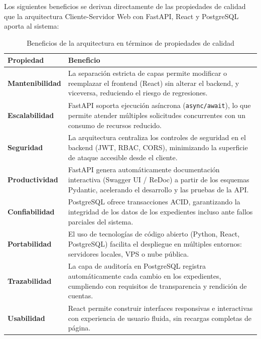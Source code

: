 Los siguientes beneficios se derivan directamente de las propiedades de calidad que la
arquitectura Cliente-Servidor Web con FastAPI, React y PostgreSQL aporta al sistema:

\begin{table}[h!]
	\centering
	\caption{Beneficios de la arquitectura en términos de propiedades de calidad}
	\renewcommand{\arraystretch}{1.4}
	\begin{tabular}{|p{3.2cm}|p{9.8cm}|}
		\hline
		\textbf{Propiedad}          & \textbf{Beneficio}                                                                                 \\ \hline
		\textbf{Mantenibilidad}     & La separación estricta de capas permite modificar o reemplazar el frontend (React)
		sin alterar el backend, y viceversa, reduciendo el riesgo de regresiones.             \\ \hline
		\textbf{Escalabilidad}      & FastAPI soporta ejecución asíncrona (\texttt{async/await}), lo que permite atender
		múltiples solicitudes concurrentes con un consumo de recursos reducido.                \\ \hline
		\textbf{Seguridad}          & La arquitectura centraliza los controles de seguridad en el backend (JWT, RBAC, CORS),
		minimizando la superficie de ataque accesible desde el cliente.                        \\ \hline
		\textbf{Productividad}      & FastAPI genera automáticamente documentación interactiva (Swagger UI / ReDoc) a partir
		de los esquemas Pydantic, acelerando el desarrollo y las pruebas de la API.           \\ \hline
		\textbf{Confiabilidad}      & PostgreSQL ofrece transacciones ACID, garantizando la integridad de los datos de los
		expedientes incluso ante fallos parciales del sistema.                                  \\ \hline
		\textbf{Portabilidad}       & El uso de tecnologías de código abierto (Python, React, PostgreSQL) facilita el
		despliegue en múltiples entornos: servidores locales, VPS o nube pública.              \\ \hline
		\textbf{Trazabilidad}       & La capa de auditoría en PostgreSQL registra automáticamente cada cambio en los
		expedientes, cumpliendo con requisitos de transparencia y rendición de cuentas.        \\ \hline
		\textbf{Usabilidad}         & React permite construir interfaces responsivas e interactivas con experiencia de usuario
		fluida, sin recargas completas de página.                                              \\ \hline
	\end{tabular}
	\label{tab:beneficios-arq}
\end{table}

